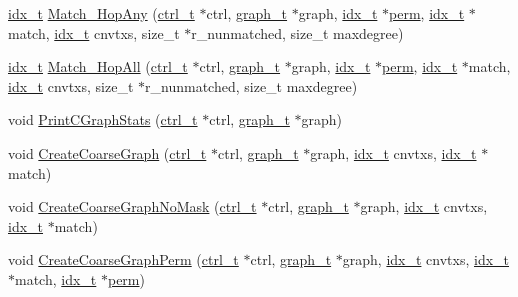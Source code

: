 \begin{DoxyCompactItemize}
\item 
\hyperlink{a00876_aaa5262be3e700770163401acb0150f52}{idx\+\_\+t} \hyperlink{a00945_a838a4013e3b5cc5278ecc7a8757ce0ef}{Match\+\_\+Hop\+Any} (\hyperlink{a00742}{ctrl\+\_\+t} $\ast$ctrl, \hyperlink{a00734}{graph\+\_\+t} $\ast$graph, \hyperlink{a00876_aaa5262be3e700770163401acb0150f52}{idx\+\_\+t} $\ast$\hyperlink{a00879_ab96e9eb84fc7c342d17690a1341645dd}{perm}, \hyperlink{a00876_aaa5262be3e700770163401acb0150f52}{idx\+\_\+t} $\ast$match, \hyperlink{a00876_aaa5262be3e700770163401acb0150f52}{idx\+\_\+t} cnvtxs, size\+\_\+t $\ast$r\+\_\+nunmatched, size\+\_\+t maxdegree)
\item 
\hyperlink{a00876_aaa5262be3e700770163401acb0150f52}{idx\+\_\+t} \hyperlink{a00945_aa56d53cace160be27fb1750dcaffbc04}{Match\+\_\+Hop\+All} (\hyperlink{a00742}{ctrl\+\_\+t} $\ast$ctrl, \hyperlink{a00734}{graph\+\_\+t} $\ast$graph, \hyperlink{a00876_aaa5262be3e700770163401acb0150f52}{idx\+\_\+t} $\ast$\hyperlink{a00879_ab96e9eb84fc7c342d17690a1341645dd}{perm}, \hyperlink{a00876_aaa5262be3e700770163401acb0150f52}{idx\+\_\+t} $\ast$match, \hyperlink{a00876_aaa5262be3e700770163401acb0150f52}{idx\+\_\+t} cnvtxs, size\+\_\+t $\ast$r\+\_\+nunmatched, size\+\_\+t maxdegree)
\item 
void \hyperlink{a00945_aac3e480e7e3bd02bfdf001d858a93562}{Print\+C\+Graph\+Stats} (\hyperlink{a00742}{ctrl\+\_\+t} $\ast$ctrl, \hyperlink{a00734}{graph\+\_\+t} $\ast$graph)
\item 
void \hyperlink{a00945_aac8820421b1c25698140c1b470c50e07}{Create\+Coarse\+Graph} (\hyperlink{a00742}{ctrl\+\_\+t} $\ast$ctrl, \hyperlink{a00734}{graph\+\_\+t} $\ast$graph, \hyperlink{a00876_aaa5262be3e700770163401acb0150f52}{idx\+\_\+t} cnvtxs, \hyperlink{a00876_aaa5262be3e700770163401acb0150f52}{idx\+\_\+t} $\ast$match)
\item 
void \hyperlink{a00945_a70dc59d4c7190507e7ad9a4cc0d80707}{Create\+Coarse\+Graph\+No\+Mask} (\hyperlink{a00742}{ctrl\+\_\+t} $\ast$ctrl, \hyperlink{a00734}{graph\+\_\+t} $\ast$graph, \hyperlink{a00876_aaa5262be3e700770163401acb0150f52}{idx\+\_\+t} cnvtxs, \hyperlink{a00876_aaa5262be3e700770163401acb0150f52}{idx\+\_\+t} $\ast$match)
\item 
void \hyperlink{a00945_a0aba484ba693edd6d56426d04bd7fd4b}{Create\+Coarse\+Graph\+Perm} (\hyperlink{a00742}{ctrl\+\_\+t} $\ast$ctrl, \hyperlink{a00734}{graph\+\_\+t} $\ast$graph, \hyperlink{a00876_aaa5262be3e700770163401acb0150f52}{idx\+\_\+t} cnvtxs, \hyperlink{a00876_aaa5262be3e700770163401acb0150f52}{idx\+\_\+t} $\ast$match, \hyperlink{a00876_aaa5262be3e700770163401acb0150f52}{idx\+\_\+t} $\ast$\hyperlink{a00879_ab96e9eb84fc7c342d17690a1341645dd}{perm})

\end{DoxyCompactItemize}
